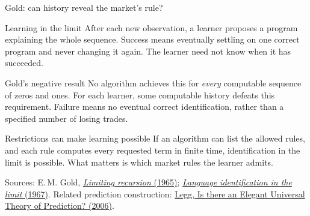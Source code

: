 \documentclass{beamer}
\newcommand{\doiref}[2]{%
  \href{https://doi.org/#1}{\textcolor{blue!65!black}{#2}}}
\newcommand{\sourcefoot}[1]{%
  \par\vfill{\fontsize{6.3}{7.5}\selectfont\color{black!65}Sources: #1\par}}
\begin{document}
\begin{frame}{Gold: can history reveal the market's rule?}
\small
\begin{block}{Learning in the limit}
After each new observation, a learner proposes a program explaining the
whole sequence. Success means eventually settling on one correct program
and never changing it again. The learner need not know when it has succeeded.
\end{block}
\begin{alertblock}{Gold's negative result}
No algorithm achieves this for \emph{every} computable sequence of zeros
and ones. For each learner, some computable history defeats this requirement.
Failure means no eventual correct identification, rather than a specified
number of losing trades.
\end{alertblock}
\begin{exampleblock}{Restrictions can make learning possible}
If an algorithm can list the allowed rules, and each rule computes every
requested term in finite time, identification in the limit is possible.
What matters is which market rules the learner admits.
\end{exampleblock}
\sourcefoot{E.\,M. Gold,
\doiref{10.2307/2270580}{\emph{Limiting recursion} (1965)};
\doiref{10.1016/S0019-9958(67)91165-5}{\emph{Language identification in the limit} (1967)}.
Related prediction construction: \doiref{10.48550/arXiv.cs/0606070}{Legg, Is there an Elegant Universal Theory of Prediction? (2006)}.}
\end{frame}
\end{document}
